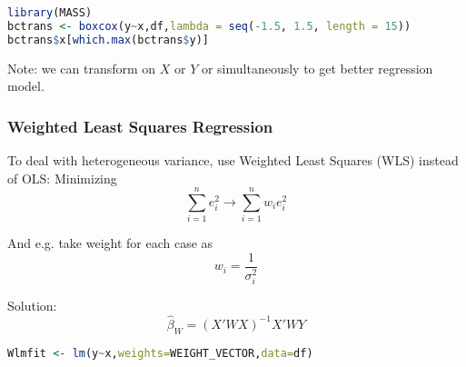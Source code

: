 \begin{itemize}[topsep=2pt,itemsep=2pt]
\begin{itemize}[topsep=2pt,itemsep=2pt]
                
            \end{itemize}
            
                
            
\begin{rcode}
\begin{lstlisting}[language=R]
library(MASS)
bctrans <- boxcox(y~x,df,lambda = seq(-1.5, 1.5, length = 15))
bctrans$x[which.max(bctrans$y)]
\end{lstlisting}

    \end{rcode}
            
            
        Note: we can transform on $ X $ or $ Y $ or simultaneously to get better regression model.
        
    \end{itemize}

\subsubsection{Weighted Least Squares Regression}
    To deal with heterogeneous variance, use Weighted Least Squares (WLS) instead of OLS: Minimizing
    \begin{equation}
        \sum_{i=1}^ne_i^2\longrightarrow \sum_{i=1}^nw_ie^2_i         
    \end{equation}
    
    And e.g. take weight for each case as 
    \begin{equation}
        w_i=\dfrac{1}{\sigma _i^2} 
    \end{equation}

    Solution:
    \begin{equation}
        \hat{\beta }_W=(X'WX)^{-1}X'WY 
    \end{equation}
    
    
\begin{rcode}
\begin{lstlisting}[language=R]
Wlmfit <- lm(y~x,weights=WEIGHT_VECTOR,data=df)
\end{lstlisting}
\end{rcode}
    
    
    







